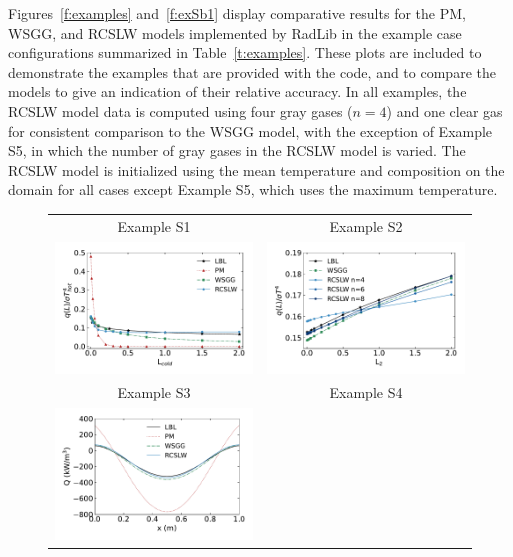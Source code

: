 \documentclass[preprint,12pt]{elsarticle}
\begin{document}
    Figures~\ref{f:examples} and~\ref{f:exSb1} display comparative results for the PM, WSGG, and RCSLW models implemented by RadLib in the example case configurations summarized in Table~\ref{t:examples}. These plots are included to demonstrate the examples that are provided with the code, and to compare the models to give an indication of their relative accuracy. In all examples, the RCSLW model data is computed using four gray gases ($n=4$) and one clear gas for consistent comparison to the WSGG model, with the exception of Example S5, in which the number of gray gases in the RCSLW model is varied. The RCSLW model is initialized using the mean temperature and composition on the domain for all cases except Example S5, which uses the maximum temperature.
%
    \begin{figure}
        \begin{center}
            \begin{tabular}{c c}
                Example S1                                      & Example S2 \\
                \includegraphics[width=2.75 in]{fig_ex_S1.pdf} &
                \includegraphics[width=2.75 in]{fig_ex_S2b.pdf} \\
                Example S3                                      & Example S4 \\
                \includegraphics[width=2.75 in]{fig_ex_S3a.pdf} &

\end{tabular}
\end{center}
\end{figure}
\end{document}
